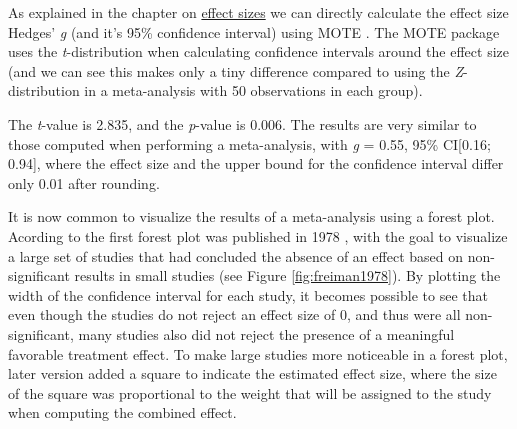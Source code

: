\documentclass[
  oneside]{book}
\begin{document}
As explained in the chapter on \protect\hyperlink{effectsize}{effect sizes} we can directly calculate the effect size Hedges' \emph{g} (and it's 95\% confidence interval) using MOTE \citep{buchanan_mote_2017}. The MOTE package uses the \emph{t}-distribution when calculating confidence intervals around the effect size (and we can see this makes only a tiny difference compared to using the \emph{Z}-distribution in a meta-analysis with 50 observations in each group).

The \emph{t}-value is 2.835, and the \emph{p}-value is 0.006. The results are very similar to those computed when performing a meta-analysis, with \emph{g} = 0.55, 95\% CI{[}0.16; 0.94{]}, where the effect size and the upper bound for the confidence interval differ only 0.01 after rounding.

It is now common to visualize the results of a meta-analysis using a forest plot. Acording to \citet{cooper_handbook_2009} the first forest plot was published in 1978 \citep{freiman_importance_1978}, with the goal to visualize a large set of studies that had concluded the absence of an effect based on non-significant results in small studies (see Figure \ref{fig:freiman1978}). By plotting the width of the confidence interval for each study, it becomes possible to see that even though the studies do not reject an effect size of 0, and thus were all non-significant, many studies also did not reject the presence of a meaningful favorable treatment effect. To make large studies more noticeable in a forest plot, later version added a square to indicate the estimated effect size, where the size of the square was proportional to the weight that will be assigned to the study when computing the combined effect.
\end{document}
